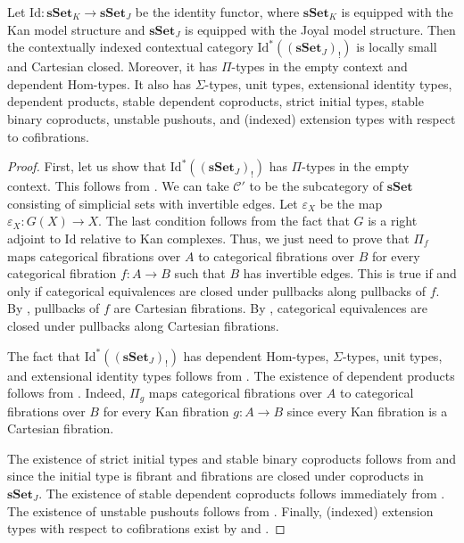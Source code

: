 \documentclass[reqno]{amsart}
\theoremstyle{definition}
\theoremstyle{remark}
\newcommand{\fs}[1]{\mathrm{#1}}
\newcommand{\cat}[1]{\mathbf{#1}}
\newcommand{\scat}[1]{\mathcal{#1}}
\newcommand{\sSet}{\cat{sSet}}
\newcommand{\Hom}{\fs{Hom}}
\newcommand{\Id}{\fs{Id}}
\numberwithin{figure}{section}
\begin{document}
\begin{thm}
Let $\Id : \sSet_K \to \sSet_J$ be the identity functor, where $\sSet_K$ is equipped with the Kan model structure and $\sSet_J$ is equipped with the Joyal model structure.
Then the contextually indexed contextual category $\Id^*((\sSet_J)_!)$ is locally small and Cartesian closed.
Moreover, it has $\Pi$-types in the empty context and dependent $\Hom$-types.
It also has $\Sigma$-types, unit types, extensional identity types, dependent products, stable dependent coproducts, strict initial types, stable binary coproducts, unstable pushouts, and (indexed) extension types with respect to cofibrations.
\end{thm}
\begin{proof}
First, let us show that $\Id^*((\sSet_J)_!)$ has $\Pi$-types in the empty context.
This follows from .
We can take $\scat{C}'$ to be the subcategory of $\sSet$ consisting of simplicial sets with invertible edges.
Let $\varepsilon_X$ be the map $\varepsilon_X : G(X) \to X$.
The last condition follows from the fact that $G$ is a right adjoint to $\Id$ relative to Kan complexes.
Thus, we just need to prove that $\Pi_f$ maps categorical fibrations over $A$ to categorical fibrations over $B$ for every categorical fibration $f : A \to B$ such that $B$ has invertible edges.
This is true if and only if categorical equivalences are closed under pullbacks along pullbacks of $f$.
By , pullbacks of $f$ are Cartesian fibrations.
By \cite[Proposition~3.3.1.3]{lurie-topos}, categorical equivalences are closed under pullbacks along Cartesian fibrations.

The fact that $\Id^*((\sSet_J)_!)$ has dependent $\Hom$-types, $\Sigma$-types, unit types, and extensional identity types follows from .
The existence of dependent products follows from .
Indeed, $\Pi_g$ maps categorical fibrations over $A$ to categorical fibrations over $B$ for every Kan fibration $g : A \to B$ since every Kan fibration is a Cartesian fibration.

The existence of strict initial types and stable binary coproducts follows from  and  since the initial type is fibrant and fibrations are closed under coproducts in $\sSet_J$.
The existence of stable dependent coproducts follows immediately from .
The existence of unstable pushouts follows from .
Finally, (indexed) extension types with respect to cofibrations exist by  and .
\end{proof}



\end{document}
